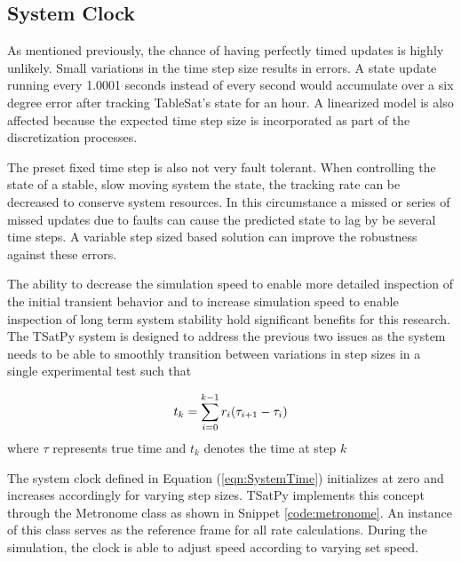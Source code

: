 \subsection{System Clock}
\label{subsec:SystemClock}

As mentioned previously, the chance of having perfectly timed updates is highly unlikely.  Small variations in the time step size results in errors.  A state update running every 1.0001 seconds instead of every second would accumulate over a six degree error after tracking TableSat's state for an hour.  A linearized model is also affected because the expected time step size is incorporated as part of the discretization processes.

The preset fixed time step is also not very fault tolerant.  When controlling the state of a stable, slow moving system the state, the tracking rate can be decreased to conserve system resources.  In this circumstance a missed or series of missed updates due to faults can cause the predicted state to lag by be several time steps.  A variable step sized based solution can improve the robustness against these errors.

The ability to decrease the simulation speed to enable more detailed inspection of the initial transient behavior and to increase simulation speed to enable inspection of long term system stability hold significant benefits for this research.  The TSatPy system is designed to address the previous two issues as the system needs to be able to smoothly transition between variations in step sizes in a single experimental test such that

\begin{equation}
  t_k = \sum\limits_{i=0}^{k-1} r_i (\tau_{i+1} - \tau_i)\\
  \label{eqn:SystemTime}
\end{equation}
where $\tau$ represents true time and $t_k$ denotes the time at step $k$

The system clock defined in Equation (\ref{eqn:SystemTime}) initializes at zero and increases accordingly for varying step sizes.  TSatPy implements this concept through the Metronome class as shown in Snippet \ref{code:metronome}.  An instance of this class serves as the reference frame for all rate calculations.  During the simulation, the clock is able to adjust speed according to varying set speed.

